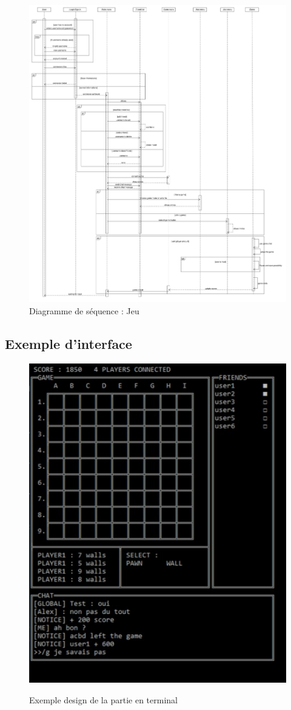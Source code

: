 \documentclass[a4paper,10pt]{article}
\begin{document}
\begin{figure}[H]
	\includegraphics[width=6in]{sequence/game.pdf}
	\caption{Diagramme de séquence : Jeu}
\end{figure}






\newpage
\subsection{Exemple d'interface}
\begin{figure}[H]
	\includegraphics[width=6in]{images/terminal-example.jpg}\\
	\caption{Exemple design de la partie en terminal}
\end{figure}
\newpage
\end{document}
